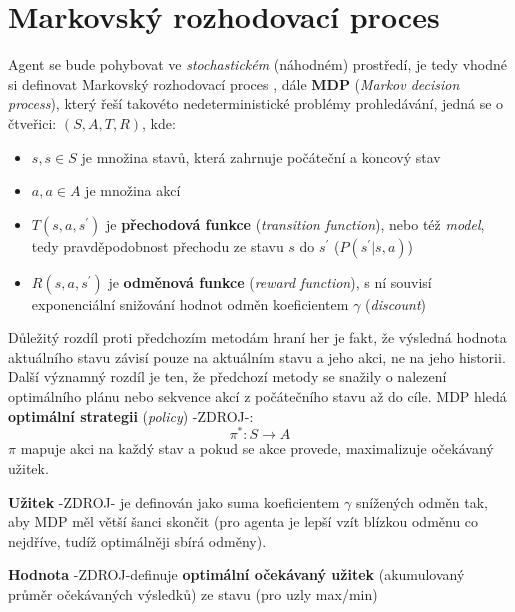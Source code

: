\section{Markovský rozhodovací proces}
Agent se bude pohybovat ve \textit{stochastickém} (náhodném) prostředí, je tedy vhodné si definovat Markovský rozhodovací proces \cite{RLAprox}, dále \textbf{MDP} (\textit{Markov decision process}), který řeší takovéto nedeterministické problémy prohledávání, jedná se o čtveřici:
$(S,A,T,R)$, kde:
\begin{itemize}
\item $s, s \in S$ je množina stavů, která zahrnuje počáteční a koncový stav
\item $a, a \in A$ je množina akcí
\item $T(s,a,s^\prime)$ je \textbf{přechodová funkce} (\textit{transition function}), nebo též \textit{model}, tedy pravděpodobnost přechodu ze stavu $s$ do $s^\prime$ ($P(s^\prime| s, a) $)
\item $R(s,a,s^\prime)$ je  \textbf{odměnová funkce} (\textit{reward function}), s ní souvisí exponenciální snižování hodnot odměn koeficientem $\gamma$ (\textit{discount})
\end{itemize}
Důležitý rozdíl proti předchozím metodám hraní her je fakt, že výsledná hodnota aktuálního stavu závisí pouze na aktuálním stavu a jeho akci, ne na jeho historii.
Další významný rozdíl je ten, že předchozí metody se snažily o nalezení optimálního plánu nebo sekvence akcí z počátečního stavu až do cíle. MDP hledá \textbf{optimální strategii} (\textit{policy}) -ZDROJ-:
\begin{displaymath}
\pi^*: S \to A
\end{displaymath}
$\pi$ mapuje akci na každý stav a pokud se akce provede, maximalizuje očekávaný užitek.

\textbf{Užitek} -ZDROJ- je definován jako suma koeficientem $\gamma$ snížených odměn tak, aby MDP měl větší šanci skončit (pro agenta je lepší vzít blízkou odměnu co nejdříve, tudíž optimálněji sbírá odměny).

\textbf{Hodnota} -ZDROJ-definuje \textbf{optimální očekávaný užitek} (akumulovaný průměr očekávaných výsledků) ze stavu (pro uzly max/min)

